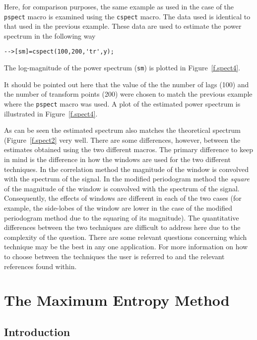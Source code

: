 	Here, for comparison purposes, the same example as used in
the case of the {\tt pspect} macro is examined using the {\tt cspect}
macro.  The data used is identical
to that used in the previous example.  These data 
are used to estimate the power spectrum
in the following way
\begin{verbatim}
-->[sm]=cspect(100,200,'tr',y);
\end{verbatim}
The log-magnitude of the power spectrum ({\tt sm}) is plotted in
Figure~\ref{f.spect4}.  

It should be pointed 
out here that the value of the 
the number of lags (100) and the number of transform points (200)
were chosen to match the previous example where the {\tt pspect}
macro was used.
A plot of the estimated power spectrum is illustrated in
Figure~\ref{f.spect4}.
%

%
As can be seen the estimated spectrum also matches the theoretical spectrum
(Figure~\ref{f.spect2} very well.  There are some differences,
however, between the estimates obtained using the two different macros.
The primary difference to keep in mind is the difference in how the windows
are used for the two different techniques.  In the correlation
method the magnitude of the window is convolved with the
spectrum of the signal.  In the modified periodogram method the {\em square}
of the magnitude of the window is convolved with the spectrum of the signal.
Consequently, the effects of windows are different in each of the two cases
(for example, the side-lobes of the window are lower in the case of the 
modified periodogram method due to the squaring of its magnitude).
The quantitative differences between the two techniques are difficult
to address here due to the complexity of the question.  There are some
relevant questions concerning which technique may be the best in any
one application.  For more information on how to choose between the
techniques the user is referred to \cite{rabiner} and the relevant references
found within.


\section{The Maximum Entropy Method}
\subsection{Introduction}

